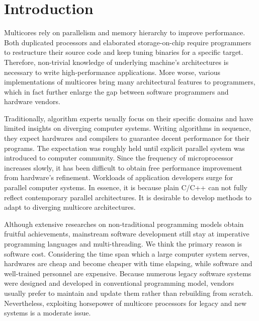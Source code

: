 

\section{Introduction}\label{sec:Intro}
Multicores rely on parallelism and memory
hierarchy to improve performance. Both duplicated processors and
elaborated storage-on-chip require programmers to restructure their
source code and keep tuning binaries for a specific target. Therefore,
non-trivial knowledge of underlying machine's architectures is
necessary to write high-performance applications. More worse, various
implementations of multicores bring many architectural
features to programmers, which in fact further enlarge the gap between software
programmers and hardware vendors.

Traditionally, algorithm experts usually focus on their specific domains and have
limited insights on diverging computer systems. Writing algorithms in
sequence, they expect hardwares
and compilers to guarantee decent performance for their
programs. The expectation was roughly held until explicit parallel system was
introduced to computer community. Since the frequency of microprocessor
increases slowly, it has been difficult to obtain free
performance improvement from hardware's refinement. Workloads
of application developers surge for parallel computer
systems. In essence, it is because plain C/C++ can not fully reflect contemporary
parallel architectures. It is desirable to develop
methods to adapt to diverging multicore architectures.

Although extensive researches on non-traditional
programming models obtain fruitful achievements, mainstream software development still
stay at imperative programming languages and multi-threading.
We think the primary reason is software cost. Considering the time span
which a large computer system serves, hardwares are cheap and become
cheaper with time elapsing, while software and well-trained personnel are
expensive. Because numerous legacy software systems were designed and
developed in conventional programming model, vendors usually prefer to
maintain and update them rather than
rebuilding from scratch. Nevertheless, exploiting horsepower of
multicore processors for legacy and new systems is a moderate issue.

